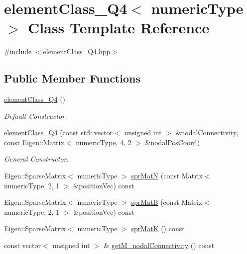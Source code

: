 \hypertarget{classelement_class___q4}{}\section{element\+Class\+\_\+\+Q4$<$ numeric\+Type $>$ Class Template Reference}
\label{classelement_class___q4}


{\ttfamily \#include $<$element\+Class\+\_\+\+Q4.\+hpp$>$}

\subsection*{Public Member Functions}
\begin{DoxyCompactItemize}
\item 
\mbox{\label{classelement_class___q4_a394807d1b7b587bdf8a9fef0ad207cb0}} 
\mbox{\hyperlink{classelement_class___q4_a394807d1b7b587bdf8a9fef0ad207cb0}{element\+Class\+\_\+\+Q4}} ()
\begin{DoxyCompactList}\small\item\em Default Constructor. \end{DoxyCompactList}\item 
\mbox{\label{classelement_class___q4_a26cbfc05c8238f05269a7a596bed8264}} 
\mbox{\hyperlink{classelement_class___q4_a26cbfc05c8238f05269a7a596bed8264}{element\+Class\+\_\+\+Q4}} (const std\+::vector$<$ unsigned int $>$ \&nodal\+Connectivity, const Eigen\+::\+Matrix$<$ numeric\+Type, 4, 2 $>$ \&nodal\+Pos\+Coord)
\begin{DoxyCompactList}\small\item\em General Constructor. \end{DoxyCompactList}\item 
Eigen\+::\+Sparse\+Matrix$<$ numeric\+Type $>$ \mbox{\hyperlink{classelement_class___q4_adc47e0786349f327fe45e3744080d3c5}{spr\+MatN}} (const Matrix$<$ numeric\+Type, 2, 1 $>$ \&position\+Vec) const
\item 
Eigen\+::\+Sparse\+Matrix$<$ numeric\+Type $>$ \mbox{\hyperlink{classelement_class___q4_a7503f92c139700e19433c2843496b670}{spr\+MatB}} (const Matrix$<$ numeric\+Type, 2, 1 $>$ \&position\+Vec) const
\item 
Eigen\+::\+Sparse\+Matrix$<$ numeric\+Type $>$ \mbox{\hyperlink{classelement_class___q4_a0063f8e857239df14972ebcd95b9cdca}{spr\+MatK}} () const
\item 
const vector$<$ unsigned int $>$ \& \mbox{\hyperlink{classelement_class___q4_aa6a26e36d49ce1008285cf9eb6ef4748}{get\+M\+\_\+nodal\+Connectivity}} () const
\end{DoxyCompactItemize}


